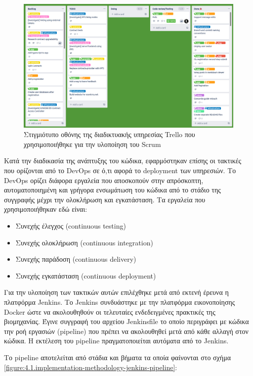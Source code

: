 \begin{figure}[H]
    \centering
    \includegraphics[width=.8\textwidth]{assets/figures/chapter-4/4.1.implementation-methodology-kanban.png}
    \caption{Στιγμιότυπο οθόνης της διαδικτυακής υπηρεσίας Trello που χρησιμοποιήθηκε για την υλοποίηση του Scrum}
    \label{figure:4.1.implementation-methodology-kanban}
\end{figure}

Κατά την διαδικασία της ανάπτυξης του κώδικα, εφαρμόστηκαν επίσης οι τακτικές που ορίζονται από το DevOps σε ό,τι αφορά το deployment των υπηρεσιών. Το DevOps ορίζει διάφορα εργαλεία που αποσκοπούν στην απρόσκοπτη, αυτοματοποιημένη και γρήγορα ενσωμάτωση του κώδικα από το στάδιο της συγγραφής μέχρι την ολοκλήρωση και εγκατάσταση. Τα εργαλεία που χρησιμοποιήθηκαν εδώ είναι:

\begin{itemize}
    \item Συνεχής έλεγχος (continuous testing)
    \item Συνεχής ολοκλήρωση (continuous integration)
    \item Συνεχής παράδοση (continuous delivery)
    \item Συνεχής εγκατάσταση (continuous deployment)
\end{itemize}

Για την υλοποίηση των τακτικών αυτών επιλέχθηκε μετά από εκτενή έρευνα η πλατφόρμα Jenkins. Το Jenkins συνδυάστηκε με την πλατφόρμα εικονοποίησης Docker ώστε να ακολουθηθούν οι τελευταίες ενδεδειγμένες πρακτικές της βιομηχανίας. Έγινε συγγραφή του αρχείου Jenkinsfile το οποίο περιγράφει με κώδικα την ροή εργασιών (pipeline) που πρέπει να ακολουθηθεί μετά από κάθε αλλαγή στον κώδικα. Η εκτέλεση του pipeline πραγματοποιείται αυτόματα από το Jenkins.

Το pipeline αποτελείται από στάδια και βήματα τα οποία φαίνονται στο σχήμα \ref{figure:4.1.implementation-methodology-jenkins-pipeline}:

